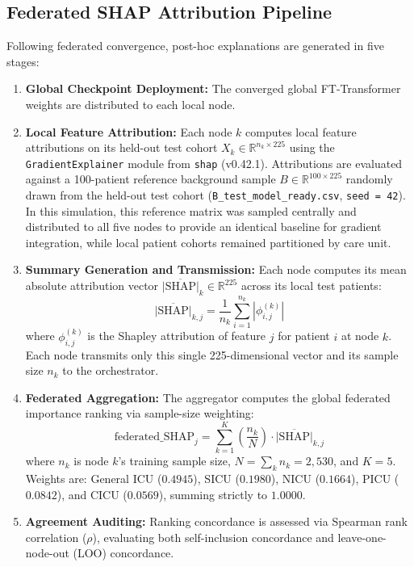\documentclass[sigconf,review,anonymous]{acmart}
\begin{document}
\subsection{Federated SHAP Attribution Pipeline}
Following federated convergence, post-hoc explanations are generated in five stages:
\begin{enumerate}
\item \textbf{Global Checkpoint Deployment:} The converged global FT-Transformer weights are distributed to each local node.
\item \textbf{Local Feature Attribution:} Each node $k$ computes local feature attributions on its held-out test cohort $X_k \in \mathbb{R}^{n_k \times 225}$ using the \texttt{GradientExplainer} module from \texttt{shap} (v0.42.1). Attributions are evaluated against a 100-patient reference background sample $B \in \mathbb{R}^{100 \times 225}$ randomly drawn from the held-out test cohort (\texttt{B\_test\_model\_ready.csv}, \texttt{seed = 42}). In this simulation, this reference matrix was sampled centrally and distributed to all five nodes to provide an identical baseline for gradient integration, while local patient cohorts remained partitioned by care unit.
\item \textbf{Summary Generation and Transmission:} Each node computes its mean absolute attribution vector $\overline{|\text{SHAP}|}_k \in \mathbb{R}^{225}$ across its local test patients:
\begin{equation}
\overline{|\text{SHAP}|}_{k,j} = \frac{1}{n_k} \sum_{i=1}^{n_k} |\phi_{i,j}^{(k)}|
\end{equation}
where $\phi_{i,j}^{(k)}$ is the Shapley attribution of feature $j$ for patient $i$ at node $k$. Each node transmits only this single 225-dimensional vector and its sample size $n_k$ to the orchestrator.
\item \textbf{Federated Aggregation:} The aggregator computes the global federated importance ranking via sample-size weighting:
\begin{equation}
\text{federated\_SHAP}_j = \sum_{k=1}^{K} \left(\frac{n_k}{N}\right) \cdot \overline{|\text{SHAP}|}_{k,j}
\label{eq:agg}
\end{equation}
where $n_k$ is node $k$'s training sample size, $N = \sum_k n_k = 2{,}530$, and $K = 5$. Weights are: General ICU ($0.4945$), SICU ($0.1980$), NICU ($0.1664$), PICU ($0.0842$), and CICU ($0.0569$), summing strictly to $1.0000$.
\item \textbf{Agreement Auditing:} Ranking concordance is assessed via Spearman rank correlation ($\rho$), evaluating both self-inclusion concordance and leave-one-node-out (LOO) concordance.
\end{enumerate}
\end{document}
